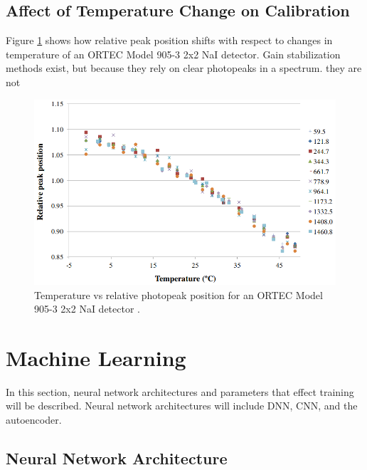 

\subsection{Affect of Temperature Change on Calibration}


Figure \ref{fig:CASANOVAS2012588} shows how relative peak position shifts with respect to changes in temperature of an ORTEC Model 905-3 2x2 NaI detector. Gain stabilization methods exist, but because they rely on clear photopeaks in a spectrum. they are not 

\begin{figure}[H]
\centering
\includegraphics[width=0.95\linewidth]{images/temp_vs_relative_peak_position_CASANOVAS2012588}
\caption{Temperature vs relative photopeak position for an ORTEC Model 905-3 2x2 NaI detector \cite{CASANOVAS2012588}.}
\label{fig:CASANOVAS2012588}
\end{figure}




\section{Machine Learning}

In this section, neural network architectures and parameters that effect training will be described. Neural network architectures will include DNN, CNN, and the autoencoder. 

\subsection{Neural Network Architecture}

